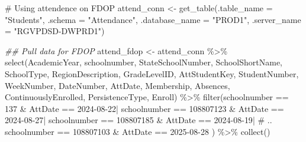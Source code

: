 \documentclass[
  letterpaper,
  DIV=11,
  numbers=noendperiod]{scrreprt}
\newenvironment{Shaded}{\begin{snugshade}}{\end{snugshade}}
\newcommand{\AttributeTok}[1]{\textcolor[rgb]{0.40,0.45,0.13}{#1}}
\newcommand{\CommentTok}[1]{\textcolor[rgb]{0.37,0.37,0.37}{#1}}
\newcommand{\DecValTok}[1]{\textcolor[rgb]{0.68,0.00,0.00}{#1}}
\newcommand{\DocumentationTok}[1]{\textcolor[rgb]{0.37,0.37,0.37}{\textit{#1}}}
\newcommand{\FunctionTok}[1]{\textcolor[rgb]{0.28,0.35,0.67}{#1}}
\newcommand{\NormalTok}[1]{\textcolor[rgb]{0.00,0.23,0.31}{#1}}
\newcommand{\OtherTok}[1]{\textcolor[rgb]{0.00,0.23,0.31}{#1}}
\newcommand{\SpecialCharTok}[1]{\textcolor[rgb]{0.37,0.37,0.37}{#1}}
\newcommand{\StringTok}[1]{\textcolor[rgb]{0.13,0.47,0.30}{#1}}
\begin{document}
\begin{Shaded}
\begin{Highlighting}[]
\CommentTok{\# Using attendence on FDOP}
\NormalTok{attend\_conn }\OtherTok{\textless{}{-}} \FunctionTok{get\_table}\NormalTok{(}\AttributeTok{.table\_name =} \StringTok{"Students"}\NormalTok{,}
                         \AttributeTok{.schema =} \StringTok{"Attendance"}\NormalTok{,}
                         \AttributeTok{.database\_name =} \StringTok{"PROD1"}\NormalTok{,}
                         \AttributeTok{.server\_name =} \StringTok{"RGVPDSD{-}DWPRD1"}\NormalTok{)}

\DocumentationTok{\#\# Pull data for FDOP}
\NormalTok{attend\_fdop }\OtherTok{\textless{}{-}}\NormalTok{ attend\_conn }\SpecialCharTok{\%\textgreater{}\%}
  \FunctionTok{select}\NormalTok{(AcademicYear,}
\NormalTok{         schoolnumber,}
\NormalTok{         StateSchoolNumber,}
\NormalTok{         SchoolShortName,}
\NormalTok{         SchoolType,}
\NormalTok{         RegionDescription,}
\NormalTok{         GradeLevelID,}
\NormalTok{         AttStudentKey,}
\NormalTok{         StudentNumber,}
\NormalTok{         WeekNumber,}
\NormalTok{         DateNumber,}
\NormalTok{         AttDate,}
\NormalTok{         Membership,}
\NormalTok{         Absences,}
\NormalTok{         ContinuouslyEnrolled,}
\NormalTok{         PersistenceType,}
\NormalTok{         Enroll) }\SpecialCharTok{\%\textgreater{}\%}
  \FunctionTok{filter}\NormalTok{(schoolnumber }\SpecialCharTok{==} \DecValTok{137} \SpecialCharTok{\&}\NormalTok{ AttDate }\SpecialCharTok{==} \StringTok{\textquotesingle{}2024{-}08{-}22\textquotesingle{}}\SpecialCharTok{|}
\NormalTok{         schoolnumber }\SpecialCharTok{==} \DecValTok{108807123} \SpecialCharTok{\&}\NormalTok{ AttDate }\SpecialCharTok{==} \StringTok{\textquotesingle{}2024{-}08{-}27\textquotesingle{}}\SpecialCharTok{|}
\NormalTok{         schoolnumber }\SpecialCharTok{==} \DecValTok{108807185} \SpecialCharTok{\&}\NormalTok{ AttDate }\SpecialCharTok{==} \StringTok{\textquotesingle{}2024{-}08{-}19\textquotesingle{}}\SpecialCharTok{|}
         \CommentTok{\# ..}
\NormalTok{         schoolnumber }\SpecialCharTok{==} \DecValTok{108807103} \SpecialCharTok{\&}\NormalTok{ AttDate }\SpecialCharTok{==} \StringTok{\textquotesingle{}2025{-}08{-}28\textquotesingle{}}
\NormalTok{        ) }\SpecialCharTok{\%\textgreater{}\%}
  \FunctionTok{collect}\NormalTok{()}
\end{Highlighting}
\end{Shaded}

\end{document}
